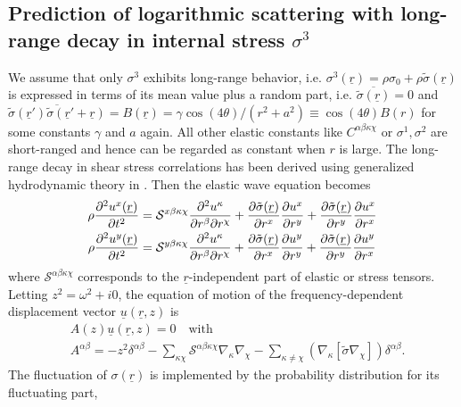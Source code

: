 \documentclass[twoside,twocolumn,9pt]{article}
\begin{document}
\begin{appendix}
\section{Prediction of logarithmic scattering with long-range decay in internal stress $\sigma^3$}
We assume that only $\sigma^3$ exhibits long-range behavior, i.e. $\sigma^3(\underline{r})=\rho\sigma_0+\rho\tilde{\sigma}(\underline{r})$ is expressed in terms of its mean value plus a random part, i.e. $\overline{\tilde{\sigma}(\underline{r})}=0$ and $\overline{\tilde{\sigma}(\underline{r}')\tilde{\sigma}(\underline{r}'+\underline{r})}=B(\underline{r})=\gamma\cos(4\theta)/(r^2+a^2)\equiv\cos(4\theta)B(r)$ for some constants $\gamma$ and $a$ again. All other elastic constants like $C^{\alpha\beta\kappa\chi}$ or $\sigma^1,\sigma^2$ are short-ranged and hence can be regarded as constant when $r$ is large. The long-range decay in shear stress correlations has been derived using generalized hydrodynamic theory in \cite{Maier2018}.
Then the elastic wave equation becomes
\begin{align}
\rho\frac{\partial^2 u^x(\underline{r})}{\partial t^2}&=\mathcal{S}^{x\beta\kappa\chi}\frac{\partial^2u^\kappa}{\partial r^\beta\partial r^\chi}+\frac{\partial\tilde{\sigma}(\underline{r})}{\partial r^x}\frac{\partial u^x}{\partial r^y}+\frac{\partial\tilde{\sigma}(\underline{r})}{\partial r^y}\frac{\partial u^x}{\partial r^x}\notag\\
\rho\frac{\partial^2 u^y(\underline{r})}{\partial t^2}&=\mathcal{S}^{y\beta\kappa\chi}\frac{\partial^2u^\kappa}{\partial r^\beta\partial r^\chi}+\frac{\partial\tilde{\sigma}(\underline{r})}{\partial r^x}\frac{\partial u^y}{\partial r^y}+\frac{\partial\tilde{\sigma}(\underline{r})}{\partial r^y}\frac{\partial u^y}{\partial r^x}
\end{align}
where $\mathcal{S}^{\alpha\beta\kappa\chi}$ corresponds to the $\underline{r}$-independent part of elastic or stress tensors.
Letting $z^2=\omega^2+i0$, the equation of motion of the frequency-dependent displacement vector $\underline{u}(\underline{r},z)$ is
\begin{align}
&A(z)\underline{u}(\underline{r},z)=0\quad\text{with}\\
&A^{\alpha\beta}=-z^2\delta^{\alpha\beta}
-\sum_{\kappa\chi}\mathcal{S}^{\alpha\beta\kappa\chi}\nabla_\kappa\nabla_\chi-\sum_{\kappa\neq\chi}(\nabla_\kappa[\tilde{\sigma}\nabla_\chi])\delta^{\alpha\beta}.
\end{align}
The fluctuation of $\sigma(\underline{r})$ is implemented by the probability distribution for its fluctuating part,

\end{appendix}
\end{document}
